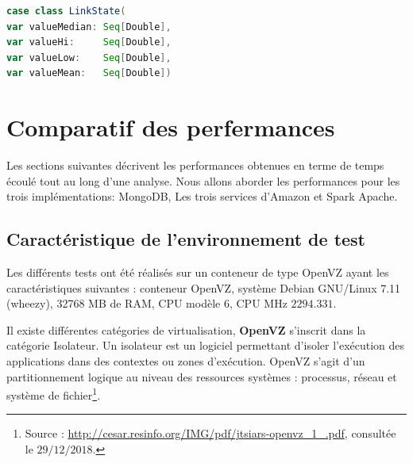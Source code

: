   

\begin{lstlisting}[language=scala, caption={La classe LinkState en Scala }]
case class LinkState(
var valueMedian: Seq[Double],
var valueHi:     Seq[Double],
var valueLow:    Seq[Double],
var valueMean:   Seq[Double])
\end{lstlisting}

\section{Comparatif des perfermances}

Les sections suivantes décrivent les performances obtenues en terme de temps écoulé tout au long d'une analyse.  Nous allons aborder les performances pour les trois implémentations: MongoDB, Les trois services d'Amazon et  Spark Apache.


\subsection{Caractéristique de l'environnement de test}

 Les différents tests ont été réalisés sur un conteneur de type OpenVZ ayant les caractéristiques suivantes : conteneur OpenVZ, système Debian GNU/Linux 7.11 (wheezy),  32768 MB de  RAM,  CPU  modèle $6$, CPU MHz $ 2294.331 $.
 


\begin{tcolorbox}
	
	Il existe différentes catégories de virtualisation, \textbf{OpenVZ} s'inscrit dans la catégorie Isolateur. Un isolateur est un logiciel permettant d'isoler l'exécution des applications dans des contextes ou zones d'exécution. OpenVZ s'agit d'un partitionnement logique au niveau des ressources systèmes : processus, réseau et système de fichier\footnote{Source : \url{http://cesar.resinfo.org/IMG/pdf/jtsiars-openvz_1_.pdf}, consultée le $29/12/2018$.}.
\end{tcolorbox}

